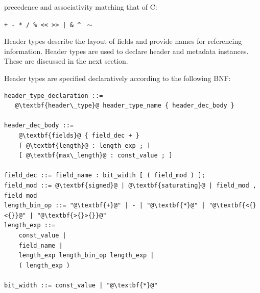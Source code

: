 \documentclass[12pt]{article}
\begin{document}
precedence and associativity matching that of C: 

\centerline{\texttt{+ - * / \% << >>  | \&  \^ } $\sim$ }



Header types describe the layout of fields and provide names for referencing 
information. Header types are used to declare header and metadata instances. 
These are discussed in the next section.

Header types are specified declaratively according to the following BNF:

\begin{lstlisting}[frame=single,backgroundcolor=\color{bnfgreen},escapechar=\@]
header_type_declaration ::= 
   @\textbf{header\_type}@ header_type_name { header_dec_body }

header_dec_body ::=
    @\textbf{fields}@ { field_dec + }
    [ @\textbf{length}@ : length_exp ; ]
    [ @\textbf{max\_length}@ : const_value ; ]

field_dec ::= field_name : bit_width [ ( field_mod ) ];
field_mod ::= @\textbf{signed}@ | @\textbf{saturating}@ | field_mod , field_mod
length_bin_op ::= "@\textbf{+}@" | - | "@\textbf{*}@" | "@\textbf{<{}<{}}@" | "@\textbf{>{}>{}}@"
length_exp ::=
    const_value |
    field_name |
    length_exp length_bin_op length_exp |
    ( length_exp )

bit_width ::= const_value | "@\textbf{*}@"
\end{lstlisting}
\end{document}
